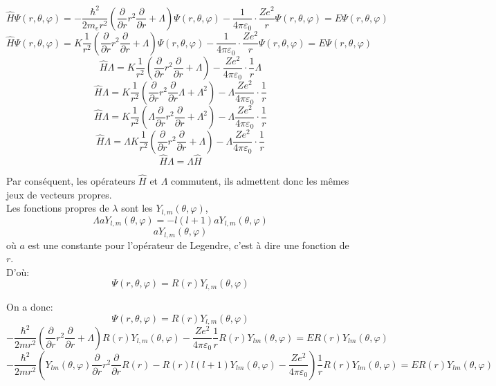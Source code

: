 \documentclass[../main.tex]{subfile}
\begin{document}
	$$\hat{H}\Psi(r, \theta, \varphi) = -\frac{\hbar^2}{2m_er^2} (\frac{\partial}{\partial r} r^2 \frac{\partial}{\partial r} + \Lambda)\Psi(r, \theta, \varphi) - \frac{1}{4\pi\varepsilon_0}\cdot \frac{Ze^2}{r}\Psi(r, \theta, \varphi) = E\Psi(r, \theta, \varphi)$$
	$$\hat{H}\Psi(r, \theta, \varphi) = K\frac{1}{r^2} (\frac{\partial}{\partial r} r^2 \frac{\partial}{\partial r} + \Lambda)\Psi(r, \theta, \varphi) - \frac{1}{4\pi\varepsilon_0}\cdot \frac{Ze^2}{r}\Psi(r, \theta, \varphi) = E\Psi(r, \theta, \varphi)$$
	$$\hat{H}\Lambda = K\frac{1}{r^2} (\frac{\partial}{\partial r} r^2 \frac{\partial}{\partial r} + \Lambda) - \frac{Ze^2}{4\pi\varepsilon_0}\cdot \frac{1}{r}\Lambda$$
	$$\hat{H}\Lambda = K\frac{1}{r^2} (\frac{\partial}{\partial r} r^2 \frac{\partial}{\partial r}\Lambda + \Lambda^2) - \Lambda\frac{Ze^2}{4\pi\varepsilon_0}\cdot \frac{1}{r}$$
	$$\hat{H}\Lambda = K\frac{1}{r^2} (\Lambda\frac{\partial}{\partial r} r^2 \frac{\partial}{\partial r} + \Lambda^2) - \Lambda\frac{Ze^2}{4\pi\varepsilon_0}\cdot \frac{1}{r}$$
	$$\hat{H}\Lambda = \Lambda K\frac{1}{r^2} (\frac{\partial}{\partial r} r^2 \frac{\partial}{\partial r} + \Lambda) - \Lambda\frac{Ze^2}{4\pi\varepsilon_0}\cdot \frac{1}{r}$$
	$$\hat{H}\Lambda = \Lambda \hat{H}$$

	Par conséquent, les opérateurs $\hat{H}$ et $\Lambda$ commutent, 
	ils admettent donc les mêmes jeux de vecteurs propres.\\

	Les fonctions propres de $\lambda$ sont les $Y_{l,m}(\theta, \varphi)$, \\
	$$\Lambda a Y_{l,m}(\theta, \varphi) = -l(l+1) a Y_{l,m}(\theta, \varphi) $$
	$$a Y_{l,m}(\theta, \varphi)$$
	où $a$ est une constante pour l'opérateur de Legendre, c'est à dire une fonction de $r$.\\
	D'où:
	$$\Psi(r, \theta, \varphi) = R(r)Y_{l,m}(\theta, \varphi)$$

	On a donc:
	$$\Psi(r, \theta, \varphi) = R(r)Y_{l,m}(\theta, \varphi)$$
	$$-\frac{\hbar^2}{2mr^2}(\frac{\partial}{\partial r} r^2 \frac{\partial}{\partial r}+ \Lambda) R(r) Y_{l,m}(\theta, \varphi) - \frac{Ze^2}{4\pi\varepsilon_0}\frac{1}{r} R(r)Y_{lm}(\theta, \varphi) = ER(r)Y_{lm}(\theta, \varphi)$$
	$$-\frac{\hbar^2}{2mr^2}(Y_{lm}(\theta, \varphi)\frac{\partial}{\partial r} r^2 \frac{\partial}{\partial r}R(r) - R(r) l(l+1) Y_{lm}(\theta, \varphi) -\frac{Ze^2}{4\pi\varepsilon_0})\frac{1}{r} R(r)Y_{lm}(\theta, \varphi) = ER(r)Y_{lm}(\theta, \varphi)$$
\end{document}
